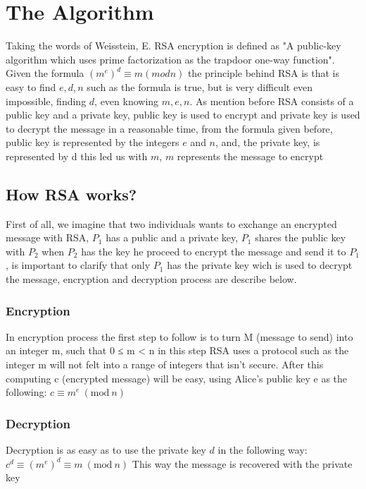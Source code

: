 \documentclass[conference,compsoc, 10pt]{IEEEtran}
\newcommand{\Mod}[1]{\ (\mathrm{mod}\ #1)}
\begin{document}
\section{The Algorithm}
Taking the words of Weisstein, E. RSA encryption is defined as "A public-key algorithm which uses prime factorization as the trapdoor one-way function". Given the formula $(m^e)^d \equiv m (mod n)$ the principle behind RSA is that is easy to find $e, d, n$ such as the formula is true, but is very difficult even impossible, finding $d$, even knowing $m, e, n$. As mention before RSA consists of a public key and a private key, public key is used to encrypt and private key is used to decrypt the message in a reasonable time, from the formula given before, public key is represented by the integers $e$ and $n$, and, the private key, is represented by d this led us with $m$, $m$ represents the message to encrypt

\subsection{How RSA works?}
First of all, we imagine that two individuals wants to exchange an encrypted message with RSA, $P_{1}$ has a public and a private key, $P_{1}$ shares the public key with $P_{2}$ when $P_{2}$ has the key he proceed to encrypt the message and send it to $P_{1}$, is important to clarify that only $P_{1}$ has the private key wich is used to decrypt the message, encryption and decryption process are describe below.  
\subsubsection{Encryption}
In encryption process the first step to follow is to turn M (message to send) into an integer m, such that 0 ≤ m < n in this step RSA uses a protocol such as the integer m will not felt into a range of integers that isn't secure. After this computing c (encrypted message) will be easy, using Alice's public key e as the following:
$c \equiv m^e \Mod{n}$
\subsubsection{Decryption}
Decryption is as easy as to use the private key $d$ in the following way:\newline
$c^d \equiv (m^e)^d \equiv m \Mod{n}$\newline
This way the message is recovered with the private key
\end{document}
